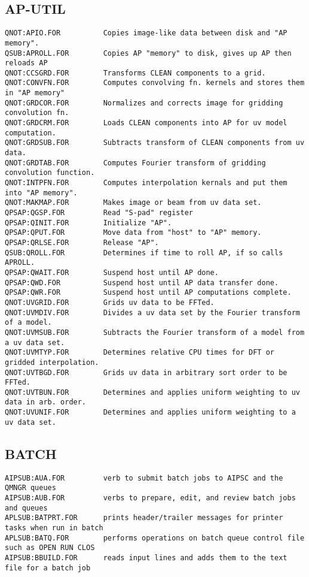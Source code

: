 \subsection{AP-UTIL}
\begin{verbatim}
QNOT:APIO.FOR          Copies image-like data between disk and "AP memory".
QSUB:APROLL.FOR        Copies AP "memory" to disk, gives up AP then reloads AP
QNOT:CCSGRD.FOR        Transforms CLEAN components to a grid.
QNOT:CONVFN.FOR        Computes convolving fn. kernels and stores them in "AP memory"
QNOT:GRDCOR.FOR        Normalizes and corrects image for gridding convolution fn.
QNOT:GRDCRM.FOR        Loads CLEAN components into AP for uv model computation.
QNOT:GRDSUB.FOR        Subtracts transform of CLEAN components from uv data.
QNOT:GRDTAB.FOR        Computes Fourier transform of gridding convolution function.
QNOT:INTPFN.FOR        Computes interpolation kernals and put them into "AP memory".
QNOT:MAKMAP.FOR        Makes image or beam from uv data set.
QPSAP:QGSP.FOR         Read "S-pad" register
QPSAP:QINIT.FOR        Initialize "AP".
QPSAP:QPUT.FOR         Move data from "host" to "AP" memory.
QPSAP:QRLSE.FOR        Release "AP".
QSUB:QROLL.FOR         Determines if time to roll AP, if so calls APROLL.
QPSAP:QWAIT.FOR        Suspend host until AP done.
QPSAP:QWD.FOR          Suspend host until AP data transfer done.
QPSAP:QWR.FOR          Suspend host until AP computations complete.
QNOT:UVGRID.FOR        Grids uv data to be FFTed.
QNOT:UVMDIV.FOR        Divides a uv data set by the Fourier transform of a model.
QNOT:UVMSUB.FOR        Subtracts the Fourier transform of a model from a uv data set.
QNOT:UVMTYP.FOR        Determines relative CPU times for DFT or gridded interpolation.
QNOT:UVTBGD.FOR        Grids uv data in arbitrary sort order to be FFTed.
QNOT:UVTBUN.FOR        Determines and applies uniform weighting to uv data in arb. order.
QNOT:UVUNIF.FOR        Determines and applies uniform weighting to a uv data set.
\end{verbatim}
 
\subsection{BATCH}
\begin{verbatim}
AIPSUB:AUA.FOR         verb to submit batch jobs to AIPSC and the QMNGR queues
AIPSUB:AUB.FOR         verbs to prepare, edit, and review batch jobs and queues
APLSUB:BATPRT.FOR      prints header/trailer messages for printer tasks when run in batch
APLSUB:BATQ.FOR        performs operations on batch queue control file such as OPEN RUN CLOS
AIPSUB:BBUILD.FOR      reads input lines and adds them to the text file for a batch job
\end{verbatim}
 
